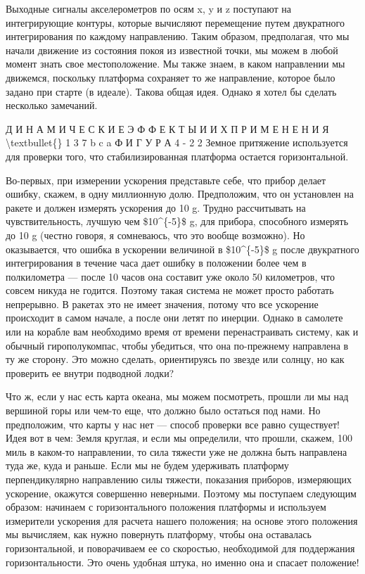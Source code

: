 \documentclass[10pt,oneside]{article}
\begin{document}
Выходные сигналы акселерометров по осям x, y и z поступают на интегрирующие контуры, которые вычисляют перемещение путем двукратного интегрирования по каждому направлению. Таким образом, предполагая, что мы начали движение из состояния покоя из известной точки, мы можем в любой момент знать свое местоположение. Мы также знаем, в каком направлении мы движемся, поскольку платформа сохраняет то же направление, которое было задано при старте (в идеале). Такова общая идея. Однако я хотел бы сделать несколько замечаний.\par

Д И Н А М И Ч Е С К И Е  Э Ф Ф Е К Т Ы  И  И Х  П Р И М Е Н Е Н И Я \textbackslash{}textbullet\{\} 1 3 7 b c a Ф И Г У Р А  4 - 2 2 Земное притяжение используется для проверки того, что стабилизированная платформа остается горизонтальной.\par

Во-первых, при измерении ускорения представьте себе, что прибор делает ошибку, скажем, в одну миллионную долю. Предположим, что он установлен на ракете и должен измерять ускорения до 10 g. Трудно рассчитывать на чувствительность, лучшую чем \$10\textasciicircum{}\{-5\}\$ g, для прибора, способного измерять до 10 g (честно говоря, я сомневаюсь, что это вообще возможно). Но оказывается, что ошибка в ускорении величиной в \$10\textasciicircum{}\{-5\}\$ g после двукратного интегрирования в течение часа дает ошибку в положении более чем в полкилометра --- после 10 часов она составит уже около 50 километров, что совсем никуда не годится. Поэтому такая система не может просто работать непрерывно. В ракетах это не имеет значения, потому что все ускорение происходит в самом начале, а после они летят по инерции. Однако в самолете или на корабле вам необходимо время от времени перенастраивать систему, как и обычный гирополукомпас, чтобы убедиться, что она по-прежнему направлена в ту же сторону. Это можно сделать, ориентируясь по звезде или солнцу, но как проверить ее внутри подводной лодки?\par

Что ж, если у нас есть карта океана, мы можем посмотреть, прошли ли мы над вершиной горы или чем-то еще, что должно было остаться под нами. Но предположим, что карты у нас нет --- способ проверки все равно существует! Идея вот в чем: Земля круглая, и если мы определили, что прошли, скажем, 100 миль в каком-то направлении, то сила тяжести уже не должна быть направлена туда же, куда и раньше. Если мы не будем удерживать платформу перпендикулярно направлению силы тяжести, показания приборов, измеряющих ускорение, окажутся совершенно неверными. Поэтому мы поступаем следующим образом: начинаем с горизонтального положения платформы и используем измерители ускорения для расчета нашего положения; на основе этого положения мы вычисляем, как нужно повернуть платформу, чтобы она оставалась горизонтальной, и поворачиваем ее со скоростью, необходимой для поддержания горизонтальности. Это очень удобная штука, но именно она и спасает положение!\par
\end{document}
